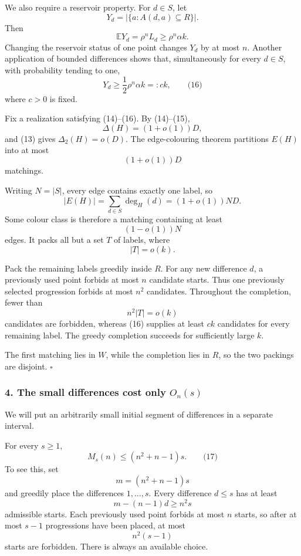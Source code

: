 \documentclass[
  11pt,
  a4paper,
]{article}
\begin{document}
We also require a reservoir property. For \(d\in S\), let \[
Y_d=\bigl|\{a:A(d,a)\subseteq R\}\bigr|.
\] Then \[
\mathbb EY_d=\rho^nL_d\ge\rho^n\alpha k.
\] Changing the reservoir status of one point changes \(Y_d\) by at most
\(n\). Another application of bounded differences shows that,
simultaneously for every \(d\in S\), with probability tending to one, \[
Y_d\ge \frac12\rho^n\alpha k=:ck,
\qquad\text{(16)}
\] where \(c>0\) is fixed.

Fix a realization satisfying (14)--(16). By (14)--(15), \[
\Delta(H)=(1+o(1))D,
\] and (13) gives \(\Delta_2(H)=o(D)\). The edge-colouring theorem
partitions \(E(H)\) into at most \[
(1+o(1))D
\] matchings.

Writing \(N=|S|\), every edge contains exactly one label, so \[
|E(H)|=\sum_{d\in S}\deg_H(d)=(1+o(1))ND.
\] Some colour class is therefore a matching containing at least \[
(1-o(1))N
\] edges. It packs all but a set \(T\) of labels, where \[
|T|=o(k).
\]

Pack the remaining labels greedily inside \(R\). For any new difference
\(d\), a previously used point forbids at most \(n\) candidate starts.
Thus one previously selected progression forbids at most \(n^2\)
candidates. Throughout the completion, fewer than \[
n^2|T|=o(k)
\] candidates are forbidden, whereas (16) supplies at least \(ck\)
candidates for every remaining label. The greedy completion succeeds for
sufficiently large \(k\).

The first matching lies in \(W\), while the completion lies in \(R\), so
the two packings are disjoint. \(\square\)

\subsubsection{\texorpdfstring{4. The small differences cost only
\(O_n(s)\)}{4. The small differences cost only O\_n(s)}}\label{the-small-differences-cost-only-o_ns}

We will put an arbitrarily small initial segment of differences in a
separate interval.

For every \(s\ge1\), \[
M_s(n)\le (n^2+n-1)s.
\qquad\text{(17)}
\] To see this, set \[
m=(n^2+n-1)s
\] and greedily place the differences \(1,\ldots,s\). Every difference
\(d\le s\) has at least \[
m-(n-1)d\ge n^2s
\] admissible starts. Each previously used point forbids at most \(n\)
starts, so after at most \(s-1\) progressions have been placed, at most
\[
n^2(s-1)
\] starts are forbidden. There is always an available choice.
\end{document}
